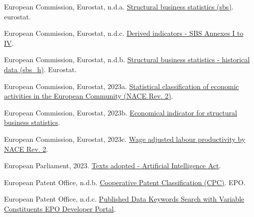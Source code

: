 \documentclass[
  11,
  a4paperpaper,
]{article}
\newlength{\cslhangindent}
\newenvironment{CSLReferences}[2] %
 {\begin{list}{}{%
  \setlength{\itemindent}{0pt}
  \setlength{\leftmargin}{0pt}
  \setlength{\parsep}{0pt}
  \ifodd #1
   \setlength{\leftmargin}{\cslhangindent}
   \setlength{\itemindent}{-1\cslhangindent}
  \fi
  \setlength{\itemsep}{#2\baselineskip}}}
 {\end{list}}
\begin{document}
\begin{CSLReferences}{1}{0}
European Commission, Eurostat, n.d.a.
\href{https://ec.europa.eu/eurostat/cache/metadata/en/sbs_esms.htm\#ref_period1696509477074}{Structural
business statistics (sbs)}. eurostat.

European Commission, Eurostat, n.d.c.
\href{https://circabc.europa.eu/sd/a/1e89d16d-e6dc-4686-8709-55cde25c06c0/Derived\%20indicators.pdf}{Derived
indicators - {SBS} {Annexes} {I} to {IV}}.

European Commission, Eurostat, n.d.b.
\href{https://ec.europa.eu/eurostat/cache/metadata/en/sbs_h_esms.htm}{Structural
business statistics - historical data (sbs\_h)}. Eurostat.

European Commission, Eurostat, 2023a.
\href{https://ec.europa.eu/eurostat/api/dissemination/sdmx/2.1/codelist/ESTAT/NACE_R2/?compressed=true&format=TSV&lang=en}{Statistical
classification of economic activities in the {European} {Community}
({NACE} {Rev}. 2)}.

European Commission, Eurostat, 2023b.
\href{https://ec.europa.eu/eurostat/api/dissemination/sdmx/2.1/codelist/ESTAT/INDIC_SB/?compressed=true&format=TSV&lang=en}{Economical
indicator for structural business statistics}.

European Commission, Eurostat, 2023c.
\href{https://data.europa.eu/data/datasets/28me30qlxbdlq7nbmc4ow?locale=en}{Wage
adjusted labour productivity by {NACE} {Rev}. 2}.

European Parliament, 2023.
\href{https://www.europarl.europa.eu/doceo/document/TA-9-2023-0236_EN.pdf}{Texts
adopted - {Artificial} {Intelligence} {Act}}.

European Patent Office, n.d.b.
\href{https://www.epo.org/en/searching-for-patents/helpful-resources/first-time-here/classification/cpc}{Cooperative
{Patent} {Classification} ({CPC})}. EPO.

European Patent Office, n.d.c.
\href{https://developers.epo.org/ops-v3-2/apis/get/published-data/search/\%7Bconstituent\%7D}{Published
{Data} {Keywords} {Search} with {Variable} {Constituents} {\textbar}
{EPO} {Developer} {Portal}}.


\end{CSLReferences}
\end{document}
